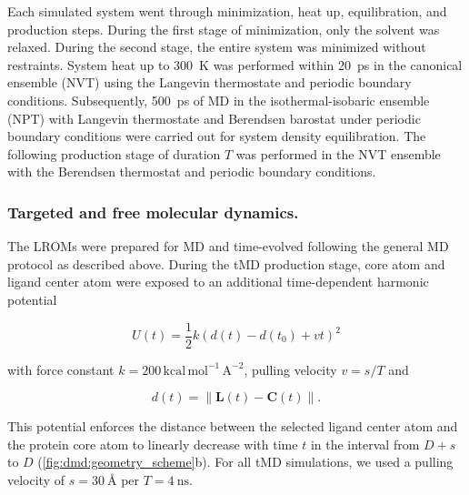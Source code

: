 Each simulated system went through minimization, heat up, equilibration, and
production steps. During the first stage of minimization, only the solvent was
relaxed. During the second stage, the entire system was minimized without
restraints. System heat up to \SI{300}{\kelvin} was performed within
\SI{20}{\pico\second} in the canonical ensemble (NVT) using the Langevin
thermostate and periodic boundary conditions. Subsequently,
\SI{500}{\pico\second} of MD in the isothermal-isobaric ensemble (NPT) with
Langevin thermostate and Berendsen barostat under periodic boundary conditions
were carried out for system density equilibration. The following production
stage of duration $T$ was performed in the NVT ensemble with the Berendsen
thermostat and periodic boundary conditions.


\subsubsection{Targeted and free molecular dynamics.}
The LROMs were prepared for MD and time-evolved following the general MD
protocol as described above. During the tMD production stage, core atom and
ligand center atom were exposed to an additional time-dependent harmonic
potential

\begin{equation}
U(t) = \frac{1}{2} k \left( d(t)-d(t_0) + vt   \right)^2
\end{equation}

with force constant $k=200\,\mathrm{kcal\,mol^{-1}\,A^{-2}}$, pulling velocity
$ v = s/T$ and

\begin{equation}
d(t) = \lVert \bm{L}(t)-\bm{C}(t) \rVert.
\end{equation}

This potential enforces the distance between the selected ligand center atom and
the protein core atom to linearly decrease with time $t$ in the interval from
$D+s$ to $D$ (\cref{fig:dmd:geometry_scheme}b). For all tMD simulations, we used
a pulling velocity of $s=\SI{30}{\angstrom}$ per $T=\SI{4}{\nano\second}$.

